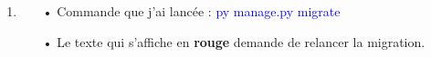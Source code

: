 \documentclass[10pt,a4paper]{article}
\begin{document}
\begin{enumerate}
\item
\begin{itemize}
\item[]
\item[•] Commande que j'ai lancée : \textcolor{blue}{py manage.py migrate}\\
\item[•] Le texte qui s'affiche en \textbf{rouge} demande de relancer la migration.



\end{itemize}

\end{enumerate}
\end{document}
